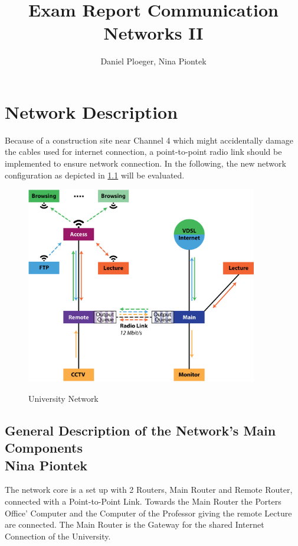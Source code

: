 \documentclass[a4paper,10pt]{book}\usepackage{graphicx}
\title{Exam Report Communication Networks II}
\author{Daniel Ploeger, Nina Piontek}
\begin{document}
\maketitle
\tableofcontents



\chapter{Network Description}
Because of a construction site near Channel 4 which might accidentally damage the cables 
used for internet connection,
a point-to-point radio link should be implemented to ensure network connection.
In the following, the new network configuration as depicted in \ref{fig:network} will be evaluated.
\begin{figure}[!ht]
  \centering
    \includegraphics[width=0.9\textwidth]{graphics-03.eps}
    \label{fig:network}
    \caption{University Network}
\end{figure}

\section{General Description of the Network's Main Components\\ {\large Nina Piontek}}
The network core is a set up with 2 Routers, Main Router and Remote Router, connected with a Point-to-Point Link. 
Towards the Main Router the Porters Office' Computer and the Computer of the Professor giving the remote Lecture are connected.
The Main Router is the Gateway for the shared Internet Connection of the University.
\end{document}
